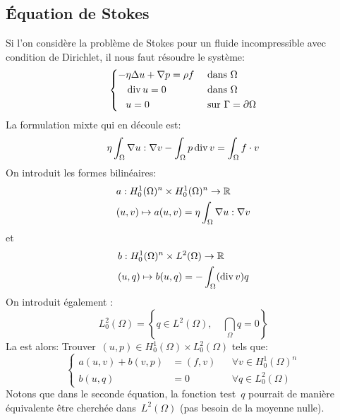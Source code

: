 \subsection{Équation de Stokes}
Si l'on considère la problème de Stokes pour un fluide incompressible avec condition de Dirichlet, il nous faut résoudre le système:
\begin{equation}\left\{
\begin{aligned}
-&\eta \Delta u + \nabla p = \rho f && \text{ dans } \Omega\\
&\operatorname{div} u = 0&& \text{ dans } \Omega\\
&u =0&& \text{ sur } \Gamma=\partial\Omega
\end{aligned}\right.
\end{equation}
La formulation mixte qui en découle est:
\begin{equation}
\eta\dint_\Omega \nabla u: \nabla v %
- \dint_\Omega p \dive v %
= \dint_\Omega f\cdot v %
\end{equation}
On introduit les formes bilinéaires:
\begin{equation}
\begin{aligned}
&a: H^1_0(\Omega)^n\times H^1_0(\Omega)^n \rightarrow \mathbb R \\
&(u,v) \mapsto a(u,v)=\eta\displaystyle\int_\Omega \nabla u: \nabla v
\end{aligned}
\end{equation}
et
\begin{equation}
\begin{aligned}
&b: H^1_0(\Omega)^n\times L^2(\Omega) \rightarrow \mathbb R\\
&(u,q) \mapsto b(u,q)=-\displaystyle\int_\Omega (\operatorname{div} v) q
\end{aligned}
\end{equation}
\medskip
On introduit également :
\begin{equation}L^2_0(\Omega)=\left\{ q\in L^2(\Omega),\quad \dint_\Omega q %
= 0\right\}\end{equation}
\medskip
La  est alors:
Trouver~$(u,p)\in H^1_0(\Omega)\times L^2_0(\Omega)$ tels que:
\begin{equation}\left\{
\begin{aligned}
a(u,v)+b(v,p) &= (f,v) && \forall v\in H^1_0(\Omega)^n \\
b(u,q) &=0 &&\forall q \in L^2_0(\Omega)
\end{aligned}\right.
\end{equation}
Notons que dans le seconde équation, la fonction test~$q$ pourrait de manière équivalente être cherchée dans~$L^2(\Omega)$ (pas besoin de la moyenne nulle).

